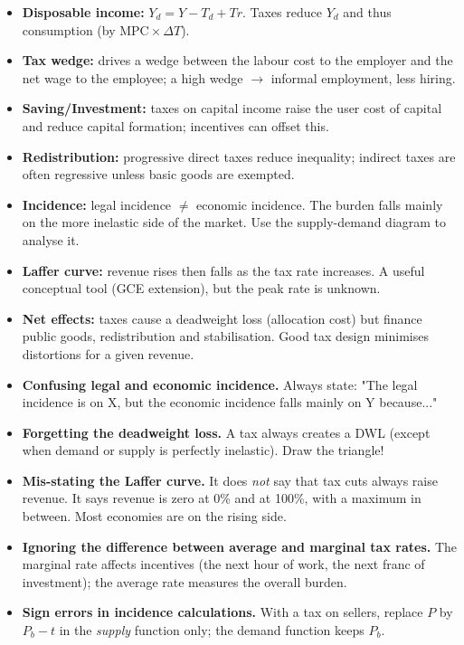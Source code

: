 \documentclass[11pt]{article}
\begin{document}
\begin{aretenir}
\begin{itemize}
    \item \textbf{Disposable income:} \(Y_d = Y - T_d + Tr\). Taxes reduce \(Y_d\) and thus consumption (by \(\text{MPC} \times \Delta T\)).
    \item \textbf{Tax wedge:} drives a wedge between the labour cost to the employer and the net wage to the employee; a high wedge $\rightarrow$ informal employment, less hiring.
    \item \textbf{Saving/Investment:} taxes on capital income raise the user cost of capital and reduce capital formation; incentives can offset this.
    \item \textbf{Redistribution:} progressive direct taxes reduce inequality; indirect taxes are often regressive unless basic goods are exempted.
    \item \textbf{Incidence:} legal incidence \(\neq\) economic incidence. The burden falls mainly on the more inelastic side of the market. Use the supply-demand diagram to analyse it.
    \item \textbf{Laffer curve:} revenue rises then falls as the tax rate increases. A useful conceptual tool (GCE extension), but the peak rate is unknown.
    \item \textbf{Net effects:} taxes cause a deadweight loss (allocation cost) but finance public goods, redistribution and stabilisation. Good tax design minimises distortions for a given revenue.
\end{itemize}
\end{aretenir}

\begin{attention}
\begin{itemize}
    \item \textbf{Confusing legal and economic incidence.} Always state: "The legal incidence is on X, but the economic incidence falls mainly on Y because..."
    \item \textbf{Forgetting the deadweight loss.} A tax always creates a DWL (except when demand or supply is perfectly inelastic). Draw the triangle!
    \item \textbf{Mis-stating the Laffer curve.} It does \emph{not} say that tax cuts always raise revenue. It says revenue is zero at 0\% and at 100\%, with a maximum in between. Most economies are on the rising side.
    \item \textbf{Ignoring the difference between average and marginal tax rates.} The marginal rate affects incentives (the next hour of work, the next franc of investment); the average rate measures the overall burden.
    \item \textbf{Sign errors in incidence calculations.} With a tax on sellers, replace \(P\) by \(P_b - t\) in the \emph{supply} function only; the demand function keeps \(P_b\).
\end{itemize}
\end{attention}
\end{document}

